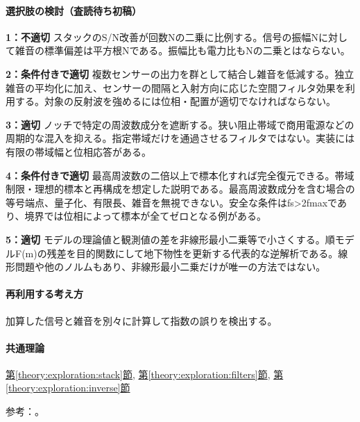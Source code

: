 \paragraph{選択肢の検討（査読待ち初稿）}\mbox{}\par

\noindent\textbf{1：不適切} スタックのS/N改善が回数Nの二乗に比例する。信号の振幅Nに対して雑音の標準偏差は平方根Nである。振幅比も電力比もNの二乗とはならない。\par

\noindent\textbf{2：条件付きで適切} 複数センサーの出力を群として結合し雑音を低減する。独立雑音の平均化に加え、センサーの間隔と入射方向に応じた空間フィルタ効果を利用する。対象の反射波を強めるには位相・配置が適切でなければならない。\par

\noindent\textbf{3：適切} ノッチで特定の周波数成分を遮断する。狭い阻止帯域で商用電源などの周期的な混入を抑える。指定帯域だけを通過させるフィルタではない。実装には有限の帯域幅と位相応答がある。\par

\noindent\textbf{4：条件付きで適切} 最高周波数の二倍以上で標本化すれば完全復元できる。帯域制限・理想的標本と再構成を想定した説明である。最高周波数成分を含む場合の等号端点、量子化、有限長、雑音を無視できない。安全な条件はfs>2fmaxであり、境界では位相によって標本が全てゼロとなる例がある。\par

\noindent\textbf{5：適切} モデルの理論値と観測値の差を非線形最小二乗等で小さくする。順モデルF(m)の残差を目的関数にして地下物性を更新する代表的な逆解析である。線形問題や他のノルムもあり、非線形最小二乗だけが唯一の方法ではない。\par

\paragraph{再利用する考え方} 加算した信号と雑音を別々に計算して指数の誤りを検出する。

\paragraph{共通理論} \hyperref[theory:exploration:stack]{第\ref*{theory:exploration:stack}節}, \hyperref[theory:exploration:filters]{第\ref*{theory:exploration:filters}節}, \hyperref[theory:exploration:inverse]{第\ref*{theory:exploration:inverse}節}

\par 参考：\cite{mit_signals2010,mit_moving2012,scipy_notch,scipy_fft,usgs_processing2000,pygimli_inversion}。


